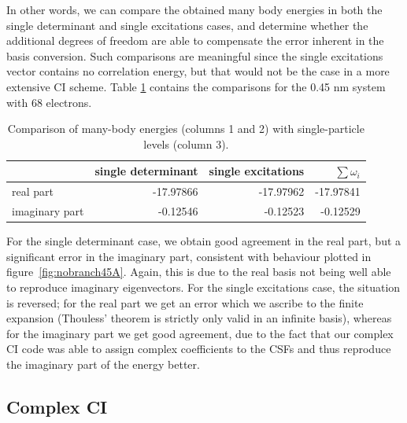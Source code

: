 In other words, we can compare the obtained many body energies in both the
single determinant and single excitations cases, and determine whether the
additional degrees of freedom are able to compensate the error inherent in the
basis conversion. Such comparisons are meaningful since the single excitations
vector contains no correlation energy, but that would not be the case in a more
extensive \ac{CI} scheme. Table \ref{tab:eesum} contains the comparisons for
the 0.45 nm system with 68 electrons.

\begin{table}
  \centering
  \begin{tabular}{l r r r} 
    \hline
                 & single determinant & single excitations & $\sum \omega_i$ \\
    \hline
    real part      & -17.97866 & -17.97962 & -17.97841\\
    imaginary part & -0.12546 & -0.12523 & -0.12529\\
    \hline
  \end{tabular}
  \caption{Comparison of many-body energies (columns 1 and 2) with
           single-particle levels (column 3).}
  \label{tab:eesum}
\end{table}

For the single determinant case, we obtain good agreement in the real part, but
a significant error in the imaginary part, consistent with behaviour plotted in
figure~\ref{fig:nobranch45A}. Again, this is due to the real basis not being 
well able to reproduce imaginary eigenvectors. For the single excitations case,
the situation is reversed; for the real part we get an error which we ascribe
to the finite expansion (Thouless' theorem is strictly only valid in an
infinite basis), whereas for the imaginary part we get good agreement, due to
the fact that our complex \ac{CI} code was able to assign complex coefficients
to the \acp{CSF} and thus reproduce the imaginary part of the energy better.

\subsection{Complex \ac{CI}}

